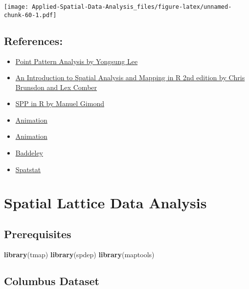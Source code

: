 \documentclass[
]{book}
\newenvironment{Shaded}{\begin{snugshade}}{\end{snugshade}}
\newcommand{\KeywordTok}[1]{\textcolor[rgb]{0.13,0.29,0.53}{\textbf{#1}}}
\newcommand{\NormalTok}[1]{#1}
\begin{document}
\texttt{[image: Applied-Spatial-Data-Analysis\_files/figure-latex/unnamed-chunk-60-1.pdf]}

\hypertarget{references}{%
\section{References:}\label{references}}

\begin{itemize}
\item
  \href{https://rpubs.com/spring19cp6521/Week11_Wednesday1}{Point Pattern Analysis by Yongsung Lee}
\item
  \href{https://bookdown.org/lexcomber/brunsdoncomber2e/Ch6.html}{An Introduction to Spatial Analysis and Mapping in R 2nd edition by Chris Brunsdon and Lex Comber}
\item
  \href{https://mgimond.github.io/Spatial/point-pattern-analysis-in-r.html}{SPP in R by Manuel Gimond}
\item
  \href{https://yihui.org/animation/example/animation-package/}{Animation}
\item
  \href{https://skirmer.github.io/animation_prez.html\#1}{Animation}
\item
  \href{https://research.csiro.au/software/wp-content/uploads/sites/6/2015/02/Rspatialcourse_CMIS_PDF-Standard.pdf}{Baddeley}
\item
  \href{http://book.spatstat.org/sample-chapters/chapter07.pdf}{Spatstat}
\end{itemize}

\hypertarget{spatial-lattice-data-analysis}{%
\chapter{Spatial Lattice Data Analysis}\label{spatial-lattice-data-analysis}}

\hypertarget{prerequisites}{%
\section{Prerequisites}\label{prerequisites}}

\begin{Shaded}
\begin{Highlighting}[]
\KeywordTok{library}\NormalTok{(tmap)}
\KeywordTok{library}\NormalTok{(spdep)}
\KeywordTok{library}\NormalTok{(maptools)}
\end{Highlighting}
\end{Shaded}

\hypertarget{columbus-dataset}{%
\section{Columbus Dataset}\label{columbus-dataset}}
\end{document}
